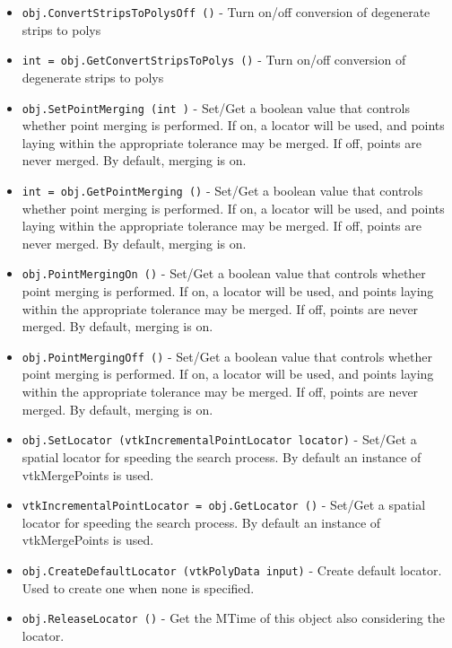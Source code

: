 \begin{itemize}
\item  \verb|obj.ConvertStripsToPolysOff ()| -  Turn on/off conversion of degenerate strips to polys

\item  \verb|int = obj.GetConvertStripsToPolys ()| -  Turn on/off conversion of degenerate strips to polys

\item  \verb|obj.SetPointMerging (int )| -  Set/Get a boolean value that controls whether point merging is
 performed. If on, a locator will be used, and points laying within
 the appropriate tolerance may be merged. If off, points are never
 merged. By default, merging is on.

\item  \verb|int = obj.GetPointMerging ()| -  Set/Get a boolean value that controls whether point merging is
 performed. If on, a locator will be used, and points laying within
 the appropriate tolerance may be merged. If off, points are never
 merged. By default, merging is on.

\item  \verb|obj.PointMergingOn ()| -  Set/Get a boolean value that controls whether point merging is
 performed. If on, a locator will be used, and points laying within
 the appropriate tolerance may be merged. If off, points are never
 merged. By default, merging is on.

\item  \verb|obj.PointMergingOff ()| -  Set/Get a boolean value that controls whether point merging is
 performed. If on, a locator will be used, and points laying within
 the appropriate tolerance may be merged. If off, points are never
 merged. By default, merging is on.

\item  \verb|obj.SetLocator (vtkIncrementalPointLocator locator)| -  Set/Get a spatial locator for speeding the search process. By
 default an instance of vtkMergePoints is used.

\item  \verb|vtkIncrementalPointLocator = obj.GetLocator ()| -  Set/Get a spatial locator for speeding the search process. By
 default an instance of vtkMergePoints is used.

\item  \verb|obj.CreateDefaultLocator (vtkPolyData input)| -  Create default locator. Used to create one when none is specified.

\item  \verb|obj.ReleaseLocator ()| -  Get the MTime of this object also considering the locator.


\end{itemize}
